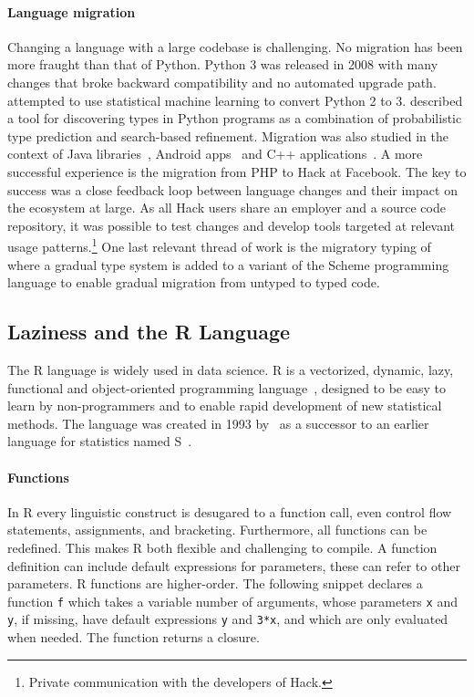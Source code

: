 \documentclass[review,creen,acmsmall]{acmart}
\renewcommand{\c}[1]{\lstinline |#1|\xspace}
\begin{document}
\paragraph{Language migration} Changing a language with a large codebase
is challenging. No migration has been more fraught than that of Python. Python 3
was released in 2008 with many changes that broke backward compatibility and no
automated upgrade path. \citet{Agg15} attempted to use statistical machine
learning to convert Python 2 to 3. \citet{Pra20} described a tool for
discovering types in Python programs as a combination of probabilistic type
prediction and search-based refinement. Migration was also studied in the
context of Java libraries~\cite{Xu19}, Android apps~\cite{Orso20} and C++
applications~\cite{OB20}. A more successful experience is the migration from PHP
to Hack at Facebook. The key to success was a close feedback loop between
language changes and their impact on the ecosystem at large. As all Hack users
share an employer and a source code repository, it was possible to test changes
and develop tools targeted at relevant usage patterns.\footnote{Private
  communication with the developers of Hack.} One last relevant thread of work
is the migratory typing of \citet{matthias06} where a gradual type system is
added to a variant of the Scheme programming language to enable gradual
migration from untyped to typed code.

\subsection{Laziness and the R Language}

The R language is widely used in data science. R is a vectorized, dynamic, lazy,
functional and object-oriented programming language~\cite{ecoop12}, designed to
be easy to learn by non-programmers and to enable rapid development of new
statistical methods. The language was created in 1993 by~\citet{R96} as a
successor to an earlier language for statistics named S~\cite{S88}.

\paragraph{Functions}
In R every linguistic construct is desugared to a function call, even control
flow statements, assignments, and bracketing. Furthermore, all functions can be
redefined. This makes R both flexible and challenging to compile. A function
definition can include default expressions for parameters, these can refer to
other parameters. R functions are higher-order. The following snippet declares a
function \c f which takes a variable number of arguments, whose parameters
\c x and \c y, if missing, have default expressions \c y and
\c{3*x}, and which are only evaluated when needed. The function returns a
closure.
\end{document}
